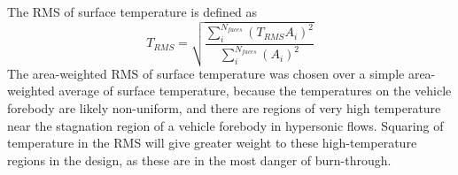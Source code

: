 The RMS of surface temperature is defined as
\begin{equation}
  T_{RMS} =
  \sqrt{
    \frac{\sum_{i}^{N_{faces}}\left( T_{RMS} A_i \right)^2}
       {\sum_{i}^{N_{faces}}\left( A_i \right)^2}
     }
  \label{tt-rms-def}
\end{equation}
The area-weighted RMS of surface temperature was chosen over a simple
area-weighted average of surface temperature, because the temperatures on the
vehicle forebody are likely non-uniform, and there are regions of very high
temperature near the stagnation region of a vehicle forebody in hypersonic
flows.  Squaring of temperature in the RMS will give greater weight to these
high-temperature regions in the design, as these are in the most danger of
burn-through.
